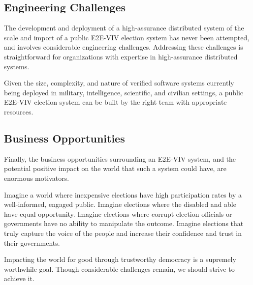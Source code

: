 \subsection{Engineering Challenges}

The development and deployment of a high-assurance distributed system
of the scale and import of a public E2E-VIV election system has never
been attempted, and involves considerable engineering
challenges. Addressing these challenges is straightforward for
organizations with expertise in high-assurance distributed systems.

Given the size, complexity, and nature of verified software systems
currently being deployed in military, intelligence, scientific, and
civilian settings, a public E2E-VIV election system can be built by
the right team with appropriate resources.

\subsection{Business Opportunities}

Finally, the business opportunities surrounding an E2E-VIV
system, and the potential positive impact on the world that such a
system could have, are enormous motivators.

Imagine a world where inexpensive elections have high participation
rates by a well-informed, engaged public. Imagine elections where the
disabled and able have equal opportunity. Imagine elections where
corrupt election officials or governments have no ability to
manipulate the outcome. Imagine elections that truly capture the voice
of the people and increase their confidence and trust in their
governments.

Impacting the world for good through trustworthy democracy is a
supremely worthwhile goal. Though considerable challenges remain, we
should strive to achieve it.
